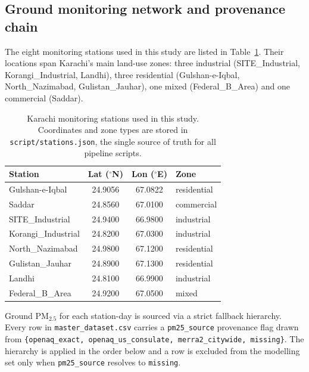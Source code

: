 \documentclass{iopjournal}
\begin{document}
\subsection{Ground monitoring network and provenance chain}

The eight monitoring stations used in this study are listed in
Table~\ref{tab:stations}. Their locations span Karachi's main
land-use zones: three industrial (SITE\_Industrial, Korangi\_Industrial,
Landhi), three residential (Gulshan-e-Iqbal, North\_Nazimabad,
Gulistan\_Jauhar), one mixed (Federal\_B\_Area) and one commercial
(Saddar).

\begin{table}
\caption{Karachi monitoring stations used in this study.
Coordinates and zone types are stored in
\texttt{script/stations.json}, the single source of truth for all
pipeline scripts.}
\centering
\begin{tabular}{l c c l}
\hline
Station & Lat ($^{\circ}$N) & Lon ($^{\circ}$E) & Zone \\
\hline
Gulshan-e-Iqbal     & 24.9056 & 67.0822 & residential \\
Saddar              & 24.8560 & 67.0100 & commercial \\
SITE\_Industrial    & 24.9400 & 66.9800 & industrial \\
Korangi\_Industrial & 24.8200 & 67.0300 & industrial \\
North\_Nazimabad    & 24.9800 & 67.1200 & residential \\
Gulistan\_Jauhar    & 24.8900 & 67.1300 & residential \\
Landhi              & 24.8100 & 66.9900 & industrial \\
Federal\_B\_Area    & 24.9200 & 67.0500 & mixed \\
\hline
\end{tabular}
\label{tab:stations}
\end{table}

Ground PM$_{2.5}$ for each station-day is sourced via a strict
fallback hierarchy. Every row in \texttt{master\_dataset.csv} carries
a \texttt{pm25\_source} provenance flag drawn from
\verb|{openaq_exact, openaq_us_consulate, merra2_citywide, missing}|.
The hierarchy is applied in the order below and a row is excluded
from the modelling set only when \texttt{pm25\_source} resolves to
\texttt{missing}.
\end{document}
